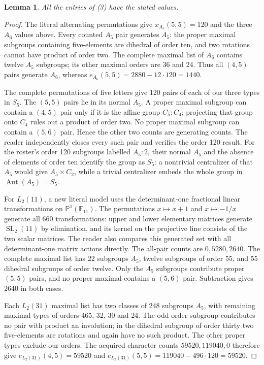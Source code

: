 \documentclass[11pt,a4paper]{article}
\newtheorem{lemma}{Lemma}\newtheorem{theorem}{Theorem}
\begin{document}
\begin{lemma}\label{small}
All the entries of (3) have the stated values.
\end{lemma}
\begin{proof}
The literal alternating permutations give
$x_{A_5}(5,5)=120$ and the three $A_6$ values above. Every counted
$A_5$ pair generates $A_5$: the proper maximal subgroups containing
five-elements are dihedral of order ten, and two rotations cannot
have product of order two. The complete maximal list of $A_6$
contains twelve $A_5$ subgroups; its other maximal orders are 36
and 24. Thus all $(4,5)$ pairs generate $A_6$, whereas
$e_{A_6}(5,5)=2880-12\cdot120=1440$.

The complete permutations of five letters give 120 pairs of each
of our three types in $S_5$. The $(5,5)$ pairs lie in its normal
$A_5$. A proper maximal subgroup can contain a $(4,5)$ pair only
if it is the affine group $C_5:C_4$; projecting that group onto
$C_4$ rules out a product of order two. No proper maximal subgroup
can contain a $(5,6)$ pair. Hence the other two counts are
generating counts. The reader independently closes every such
pair and verifies the order 120 result. For the roster's order
120 subgroups labelled $A_5:2$, their normal $A_5$ and the absence
of elements of order ten identify the group as $S_5$: a nontrivial
centralizer of that $A_5$ would give $A_5\times C_2$, while a
trivial centralizer embeds the whole group in
$\operatorname{Aut}(A_5)=S_5$.

For $L_2(11)$, a new literal model uses the determinant-one
fractional linear transformations on $\mathbb P^1(\mathbb F_{11})$.
The permutations $x\mapsto x+1$ and $x\mapsto-1/x$ generate all
660 transformations: upper and lower elementary matrices generate
$\operatorname{SL}_2(11)$ by elimination, and its kernel on the
projective line consists of the two scalar matrices. The reader
also compares this generated set with all determinant-one matrix
actions directly. The all-pair counts are $0,5280,2640$.
The complete maximal list has 22 subgroups $A_5$, twelve subgroups
of order 55, and 55 dihedral subgroups of order twelve. Only the
$A_5$ subgroups contribute proper $(5,5)$ pairs, and no proper
maximal contains a $(5,6)$ pair. Subtraction gives 2640 in both
cases.

Each $L_2(31)$ maximal list has two classes of 248 subgroups $A_5$,
with remaining maximal types of orders 465, 32, 30 and 24.
The odd order subgroup contributes no pair with product an
involution; in the dihedral subgroup of order thirty two
five-elements are rotations and again have no such product.
The other proper types exclude our orders. The acquired character
counts $59520,119040,0$ therefore give
$e_{L_2(31)}(4,5)=59520$ and
$e_{L_2(31)}(5,5)=119040-496\cdot120=59520$.


\end{proof}
\end{document}
